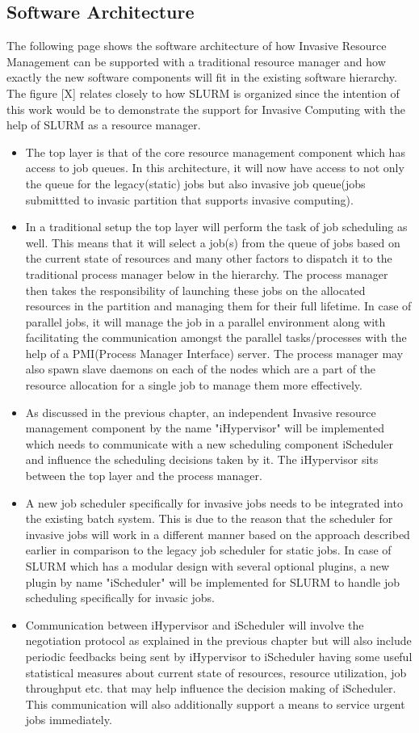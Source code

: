 \documentclass[a4paper, 12pt]{article}
\begin{document}
\subsection{Software Architecture}
The following page shows the software architecture of how Invasive Resource Management can be supported with a traditional resource manager and how exactly the new software components will fit in the existing software hierarchy. The figure [X] relates closely to how SLURM is organized since the intention of this work would be to demonstrate the support for Invasive Computing with the help of SLURM as a resource manager.
\begin{itemize}
\item The top layer is that of the core resource management component which has access to job queues. In this architecture, it will now have access to not only the queue for the legacy(static) jobs but also invasive job queue(jobs submittted to invasic partition that supports invasive computing).
\item In a traditional setup the top layer will perform the task of job scheduling as well. This means that it will select a job(s) from the queue of jobs based on the current state of resources and many other factors to dispatch it to the traditional process manager below in the hierarchy. The process manager then takes the responsibility of launching these jobs on the allocated resources in the partition and managing them for their full lifetime. In case of parallel jobs, it will manage the job in a parallel environment along with facilitating the communication amongst the parallel tasks/processes with the help of a PMI(Process Manager Interface) server. The process manager may also spawn slave daemons on each of the nodes which are a part of the resource allocation for a single job to manage them more effectively.
\item As discussed in the previous chapter, an independent Invasive resource management component by the name "iHypervisor" will be implemented which needs to communicate with a new scheduling component iScheduler and influence the scheduling decisions taken by it. The iHypervisor sits between the top layer and the process manager.
\item A new job scheduler specifically for invasive jobs needs to be integrated into the existing batch system. This is due to the reason that the scheduler for invasive jobs will work in a different manner based on the approach described earlier in comparison to the legacy job scheduler for static jobs. In case of SLURM which has a modular design with several optional plugins, a new plugin by name "iScheduler" will be implemented for SLURM to handle job scheduling specifically for invasic jobs.
\item Communication between iHypervisor and iScheduler will involve the negotiation protocol as explained in the previous chapter but will also include periodic feedbacks being sent by iHypervisor to iScheduler having some useful statistical measures about current state of resources, resource utilization, job throughput etc. that may help influence the decision making of iScheduler. This communication will also additionally support a means to service urgent jobs immediately.
\end{itemize}
\end{document}
